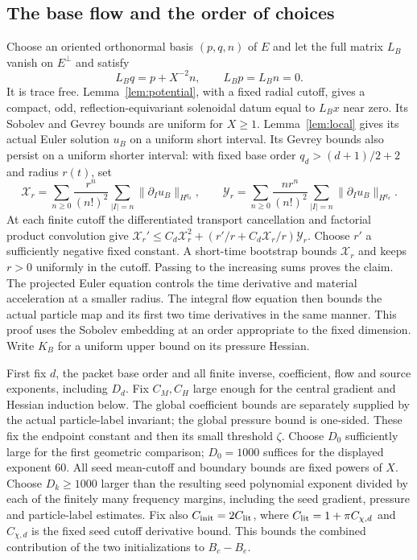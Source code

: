 \documentclass[11pt]{article}
\theoremstyle{definition}
\begin{document}
\subsection{The base flow and the order of choices}
Choose an oriented orthonormal basis $(p,q,n)$ of $E$ and let the full
matrix $L_B$ vanish on $E^\perp$ and satisfy
\[
 L_Bq=p+X^{-2}n,\qquad L_Bp=L_Bn=0.
\]
It is trace free. Lemma~\ref{lem:potential}, with a fixed radial cutoff,
gives a compact, odd, reflection-equivariant solenoidal datum equal to
$L_Bx$ near zero. Its Sobolev and Gevrey bounds are uniform for $X\geq1$.
Lemma~\ref{lem:local} gives its actual Euler solution $u_B$ on a uniform
short interval. Its Gevrey bounds also persist on a uniform shorter
interval: with fixed base order $q_d> (d+1)/2+2$ and radius $r(t)$,
set
\[
 \mathcal X_r=\sum_{n\geq0}\frac{r^n}{(n!)^2}
                  \sum_{|I|=n}\|\partial_Iu_B\|_{H^{q_d}},
 \qquad
 \mathcal Y_r=\sum_{n\geq0}\frac{nr^n}{(n!)^2}
                  \sum_{|I|=n}\|\partial_Iu_B\|_{H^{q_d}}.
\]
At each finite cutoff the differentiated transport cancellation and
factorial product convolution give
$\mathcal X_r'\leq C_d\mathcal X_r^2+
(r'/r+C_d\mathcal X_r/r)\mathcal Y_r$.
Choose $r'$ a sufficiently negative fixed constant. A short-time
bootstrap bounds $\mathcal X_r$ and keeps $r>0$ uniformly in the
cutoff. Passing to the increasing sums proves the claim. The projected
Euler equation controls the time derivative and material acceleration
at a smaller radius. The integral flow equation then bounds the actual
particle map and its first two time derivatives in the same manner.
This proof uses the Sobolev embedding at an order appropriate to the fixed dimension.
Write $K_B$ for a uniform upper bound on its pressure Hessian.

First fix $d$, the packet base order and all finite inverse, coefficient,
flow and source exponents, including $D_d$. Fix $C_M,C_H$ large enough
for the central gradient and Hessian induction below. The global
coefficient bounds are separately supplied by the actual particle-label
invariant; the global pressure bound is one-sided. These fix the
endpoint constant and then its small threshold $\zeta$.
Choose $D_0$ sufficiently large for the first geometric comparison;
$D_0=1000$ suffices for the displayed exponent $60$.
All seed mean-cutoff and boundary bounds are fixed powers of $X$.
Choose $D_k\geq1000$ larger than the resulting seed polynomial exponent
divided by each of the finitely many frequency margins, including the
seed gradient, pressure and particle-label estimates. Fix also
$C_{\rm init}=2C_{\rm lit}$, where
$C_{\rm lit}=1+\pi C_{\chi,d}$ and $C_{\chi,d}$ is the fixed seed cutoff
derivative bound. This bounds the combined contribution of the two
initializations to $B_c-B_e$.
\end{document}
